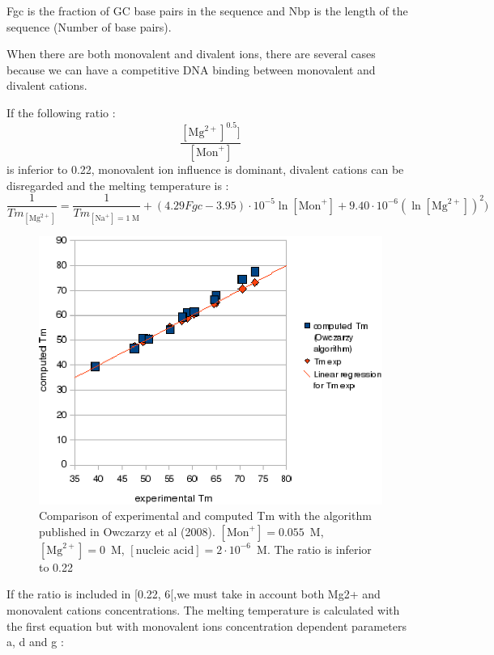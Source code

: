 \documentclass{article}
\begin{document}
Fgc is the fraction of GC base pairs in the sequence and 
Nbp is the length of the sequence (Number of base pairs).

When there are both monovalent and divalent ions, there are several cases because we can have
a competitive DNA binding between monovalent and divalent 
cations.

If the following ratio :
\begin{displaymath}
  \frac{[\mbox{Mg}^{2+}]^{0.5}]}{[\mbox{Mon}^+]}  
\end{displaymath}
is inferior to 0.22, monovalent ion influence is dominant, divalent cations can be 
disregarded and the melting temperature is :
\begin{displaymath}
\frac{1}{Tm_{[\mbox{Mg}^{2+}]}} = \frac{1}{Tm_{[\mbox{Na}^+]=1\;\mathrm{M}}} + (4.29
Fgc - 3.95)\cdot{}10^{-5} \ln [\mbox{Mon}^+] + 9.40\cdot{}10^{-6} (\ln [\mbox{Mg}^{2+}])^{2})
\end{displaymath}
  
\begin{figure}[H]
\includegraphics{Owczarzy2.eps}
\caption{Comparison of experimental and computed Tm with the algorithm published
in Owczarzy et al (2008). $[\mbox{Mon}^+] = 0.055$~M, $[\mbox{Mg}^{2+}] = 0$~M, $[\mbox{nucleic acid}] =
2\cdot{}10^{-6}$~M. The ratio is inferior to 0.22}
\end{figure}


If the ratio is included in [0.22, 6[,we must take in account both Mg2+ and monovalent cations 
concentrations. The melting temperature is calculated with the first equation but with monovalent 
ions concentration dependent parameters a, d and g :
\end{document}
